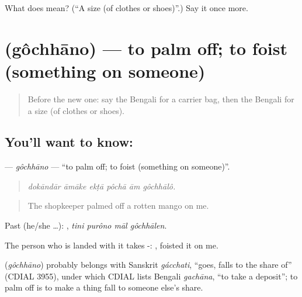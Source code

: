 \begin{tcolorbox}[breakable,colback=teal!4,colframe=teal!35!black,title={Before you move on}]
What does  mean? (\textquotedblleft{}A size (of clothes or shoes)\textquotedblright{}.) Say it once more.
\end{tcolorbox}
\section[\texorpdfstring{\bn{গছানো} (gôchhāno)}{গছানো (gôchhāno)}]{ (gôchhāno) — to palm off; to foist (something on someone)}

\label{lesson:BN-C423-gochhano}



\begin{quote}
Before the new one: say the Bengali for a carrier bag, then the Bengali for a size (of clothes or shoes).
\end{quote}

\subsection*{You'll want to know: }
\textbf{} — \emph{gôchhāno} — \textquotedblleft{}to palm off; to foist (something on someone)\textquotedblright{}.

\begin{quote}
     
\end{quote}

\begin{quote}
\emph{dokāndār āmāke ekṭā pôchā ām gôchhālô.}
\end{quote}

\begin{quote}
The shopkeeper palmed off a rotten mango on me.
\end{quote}

Past (he/she …):    , \emph{tini purôno māl gôchhālen}.

The person who is landed with it takes -:  , foisted it on me.

\begin{cousinweb}
\textbf{} (\emph{gôchhāno}) probably belongs with Sanskrit \emph{gácchati}, \textquotedblleft{}goes, falls to the share of\textquotedblright{} (CDIAL 3955), under which CDIAL lists Bengali \emph{gachāna}, \textquotedblleft{}to take a deposit\textquotedblright{}; to palm off is to make a thing fall to someone else's share.
\end{cousinweb}

